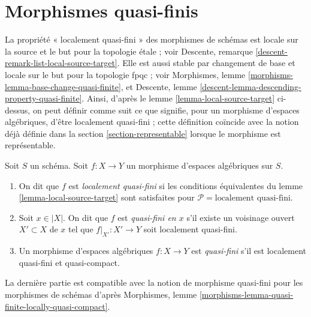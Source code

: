 \section{Morphismes quasi-finis}
\label{section-quasi-finite}

\noindent
La propriété « localement quasi-fini » des morphismes de schémas est
locale sur la source et le but pour la topologie étale ; voir
Descente, remarque \ref{descent-remark-list-local-source-target}.
Elle est aussi stable par changement de base et locale sur le but pour la
topologie fpqc ; voir Morphismes, lemme \ref{morphisms-lemma-base-change-quasi-finite}, et
Descente, lemme \ref{descent-lemma-descending-property-quasi-finite}.
Ainsi, d'après le
lemme \ref{lemma-local-source-target}
ci-dessus, on peut définir comme suit ce que signifie, pour un morphisme
d'espaces algébriques, d'être localement quasi-fini ; cette définition
coïncide avec la notion déjà définie dans la
section \ref{section-representable}
lorsque le morphisme est représentable.

\begin{definition}
\label{definition-locally-quasi-finite}
Soit $S$ un schéma.
Soit $f : X \to Y$ un morphisme d'espaces algébriques sur $S$.
\begin{enumerate}
\item On dit que $f$ est
{\it localement quasi-fini} si les conditions équivalentes du
lemme \ref{lemma-local-source-target} sont satisfaites pour
$\mathcal{P} = \text{localement quasi-fini}$.
\item Soit $x \in |X|$. On dit que $f$ est {\it quasi-fini en $x$}
s'il existe un voisinage ouvert $X' \subset X$ de $x$ tel
que $f|_{X'} : X' \to Y$ soit localement quasi-fini.
\item Un morphisme d'espaces algébriques $f : X \to Y$ est
{\it quasi-fini} s'il est localement quasi-fini et quasi-compact.
\end{enumerate}
\end{definition}

\noindent
La dernière partie est compatible avec la notion de morphisme quasi-fini pour les morphismes
de schémas d'après
Morphismes, lemme \ref{morphisms-lemma-quasi-finite-locally-quasi-compact}.

